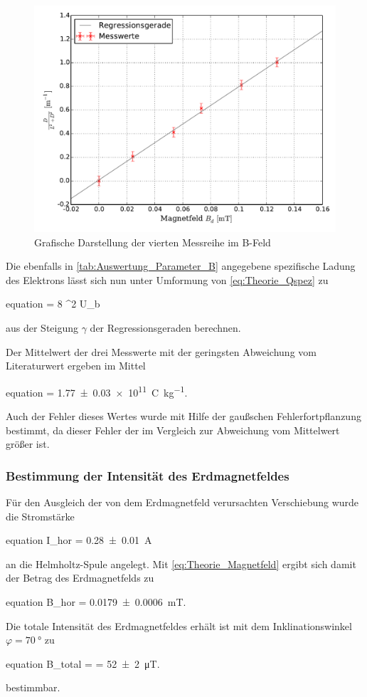 		\begin{figure}[!h]
		\centering
			\includegraphics[scale=0.7]{Grafiken/BFeld_Messreihe_IV.pdf}
			\caption{Grafische Darstellung der vierten Messreihe im B-Feld}\label{fig:Auswertung_Messdaten_II_IV}
		\end{figure}

		Die ebenfalls in \cref{tab:Auswertung_Parameter_B} angegebene spezifische Ladung des Elektrons lässt sich nun unter Umformung von \cref{eq:Theorie_Qspez} zu 
		\begin{empheq}{equation} 
			 = 8 \cdot \gamma^{2} \cdot U_{b}  
		\end{empheq}	
		aus der Steigung $\gamma$ der Regressionsgeraden berechnen.
		
		Der Mittelwert der drei Messwerte mit der geringsten Abweichung vom Literaturwert
		ergeben im Mittel
		\begin{empheq}{equation}
			\label{eq:Auswertung_Qspez} 
			 = \SI{1.77(3)e11}{\coulomb\per\kg}.
		\end{empheq}
		Auch der Fehler dieses Wertes wurde mit Hilfe der gaußschen Fehlerfortpflanzung bestimmt, 
		da dieser Fehler der im Vergleich zur Abweichung vom Mittelwert größer ist. 
\newpage		
	\subsubsection{Bestimmung der Intensität des Erdmagnetfeldes}
	
		Für den Ausgleich der von dem Erdmagnetfeld verursachten Verschiebung wurde die Stromstärke
 		\begin{empheq}{equation}
 			I_{hor} = \SI{0.28(1)}{\ampere}
 		\end{empheq}
		an die Helmholtz-Spule angelegt. Mit \cref{eq:Theorie_Magnetfeld} 
		ergibt sich damit der Betrag des Erdmagnetfelds zu 
 		\begin{empheq}{equation}
 			B_{hor} = \SI{0.0179(6)}{\milli\tesla}.
 		\end{empheq}
 		
 		Die totale Intensität des Erdmagnetfeldes erhält ist mit dem Inklinationswinkel 
 		$\varphi = \SI{70}{\degree}$ zu
 		\begin{empheq}{equation}
 			\label{eq:Auswertung_Btotal}
 			B_{total} =  = \SI{52(2)}{\micro\tesla}.
 		\end{empheq}
 		bestimmbar.
